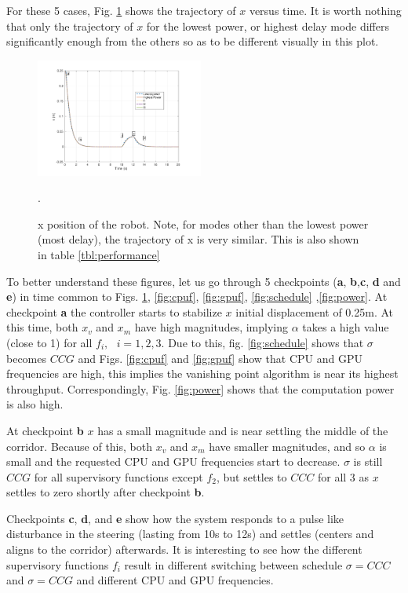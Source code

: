 For these 5 cases, Fig. \ref{fig:xvst} shows the trajectory of $x$ versus time.  It is worth nothing that only the trajectory of $x$ for the lowest power, or highest delay mode differs significantly enough from the others so as to be different visually in this plot.


\begin{figure}[hbtp]
\centering
\includegraphics[width=0.49\textwidth]{../simulations/figs/xvst.pdf}
\caption{x position of the robot. Note, for modes other than the lowest power (most delay), the trajectory of x is very similar. This is also shown in table \ref{tbl:performance}}.
\label{fig:xvst} 
\end{figure}



To better understand these figures, let us go through 5 checkpoints (\textbf{a}, \textbf{b},\textbf{c}, \textbf{d} and \textbf{e}) in time common to Figs. \ref{fig:xvst}, \ref{fig:cpuf}, \ref{fig:gpuf}, \ref{fig:schedule} ,\ref{fig:power}.
At checkpoint \textbf{a} the controller starts to stabilize $x$ initial displacement of 0.25m. At this time, both $x_v$ and $x_m$ have high magnitudes, implying $\alpha$ takes a high value (close to 1) for all $f_i,\text{ }i=1,2,3$. Due to this, fig. \ref{fig:schedule} shows that $\sigma$ becomes $CCG$ and Figs. \ref{fig:cpuf} and \ref{fig:gpuf} show that CPU and GPU frequencies are high, this implies the vanishing point algorithm is near its highest throughput. Correspondingly, Fig. \ref{fig:power} shows that the computation power is also high.

At checkpoint \textbf{b} $x$ has a small magnitude and is near settling the middle of the corridor. Because of this, both $x_v$ and $x_m$ have smaller magnitudes, and so $\alpha$ is small and the requested CPU and GPU frequencies start to decrease. $\sigma$ is still $CCG$ for all supervisory functions except $f_2$, but settles to $CCC$ for all 3 as $x$ settles to zero shortly after checkpoint \textbf{b}.

Checkpoints \textbf{c}, \textbf{d}, and \textbf{e} show how the system responds to a pulse like disturbance in the steering (lasting from 10s to 12s) and settles (centers and aligns to the corridor) afterwards. It is interesting to see how the different supervisory functions $f_i$ result in different switching between schedule $\sigma=CCC$ and $\sigma=CCG$ and different CPU and GPU frequencies.




